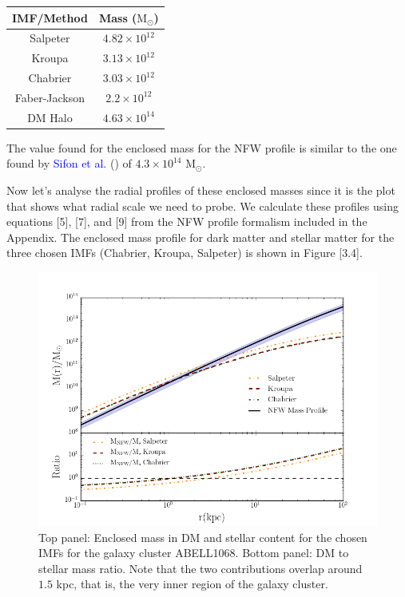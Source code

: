 \begin{center}
\begin{tabular}{c c}
IMF/Method & Mass ($\text{M}_{\odot}$)\tabularnewline
\hline 
\hline
Salpeter & $4.82\times10^{12}$\tabularnewline
Kroupa & $3.13\times10^{12}$\tabularnewline
Chabrier & $3.03\times10^{12}$\tabularnewline
Faber-Jackson & $2.2\times10^{12}$\tabularnewline
DM Halo & $4.63\times10^{14}$\tabularnewline
\end{tabular}
\end{center}

The value found for the enclosed mass for the NFW profile is similar to the one found by \textcolor{blue}{Sifon et al.} (\citeyear{Reference9}) of $4.3\times 10^{14}$ $\text{M}_{\odot}$.

Now let's analyse the radial profiles of these enclosed masses since it is the plot that shows what radial scale we need to probe. We calculate these profiles using equations [5], [7], and [9] from the NFW profile formalism included in the Appendix. The enclosed mass profile for dark matter and stellar matter for the three chosen IMFs (Chabrier, Kroupa, Salpeter) is shown in Figure [3.4].

\begin{figure}[H]
\centering
\includegraphics[width=12cm]{images/DM_fraction_all_IMFs.png}
\caption[Enclosed mass and DM to stellar mass ratio for a galaxy cluster]{Top panel: Enclosed mass in DM and stellar content for the chosen IMFs for the galaxy cluster ABELL1068. Bottom panel: DM to stellar mass ratio. Note that the two contributions overlap around $1.5 $ kpc, that is, the very inner region of the galaxy cluster.}
\end{figure}

